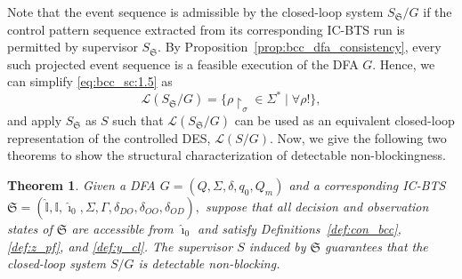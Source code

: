 \documentclass[twocolumn]{autart}
\newtheorem{mythm}{\bf Theorem}
\begin{document}
Note that the event sequence is admissible by the closed-loop system $S_{\mathfrak{S}} / G$ if the control pattern sequence extracted from its corresponding IC-BTS run is permitted by supervisor $S_{\mathfrak{S}}$.
By Proposition~\ref{prop:bcc_dfa_consistency}, every such projected event sequence is a feasible execution of the DFA $G$.
Hence, we can simplify \ref{eq:bcc_sc:1.5} as
\begin{equation}\label{eq:bcc_sc:2}
    \mathcal{L}(S_{\mathfrak{S}} / G) = \{ \rho\restriction_{\sigma} \in \Sigma^* \mid \forall \rho! \},
\end{equation}
and apply $S_\mathfrak{S}$ as $S$ such that $\mathcal{L}(S_{\mathfrak{S}} / G)$ can be used as an equivalent closed-loop representation of the controlled DES, $\mathcal{L}(S/G)$.
Now, we give the following two theorems to show the structural characterization of detectable non-blockingness. 
\begin{mythm}\label{theo:cnb}
Given a DFA $G = (Q, \Sigma, \delta, q_0, Q_m)$ and a corresponding IC-BTS
$
\mathfrak{S} = (\hat{\mathbb{I}}, \mathbb{I}, \hat{\imath}_0, \Sigma, \Gamma, \delta_{DO}, \delta_{OO}, \delta_{OD}),
$
suppose that all decision and observation states of ${\mathfrak{S}}$ are accessible from $\hat{\imath}_0$ and satisfy Definitions~\ref{def:con_bcc}, \ref{def:z_pf}, and \ref{def:y_cl}.
The supervisor $S$ induced by ${\mathfrak{S}}$ guarantees that the closed-loop system $S/G$ is detectable non-blocking.
\end{mythm}
\end{document}
